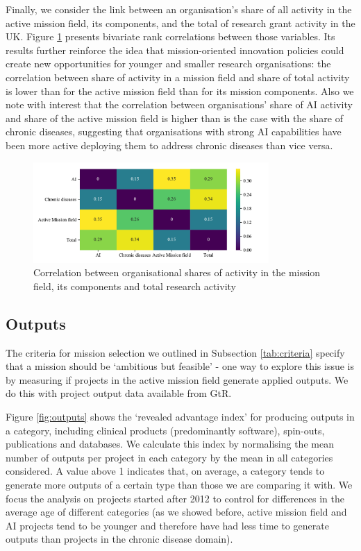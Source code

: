 \documentclass[11pt]{article}
\begin{document}
Finally, we consider the link between an organisation’s share of all activity in the active mission field, its components, and the total of research grant activity in the UK. Figure \ref{fig:share_corr} presents bivariate rank correlations between those variables. Its results further reinforce the idea that mission-oriented innovation policies could create new opportunities for younger and smaller research organisations: the correlation between share of activity in a mission field and share of total activity is lower than for the active mission field than for its mission components. Also we note with interest that the correlation between organisations' share of AI activity and share of the active mission field is higher than is the case with the share of chronic diseases, suggesting that organisations with strong AI capabilities have been more active deploying them to address chronic diseases than vice versa.

\begin{figure}[!ht]
    \centering
    \includegraphics[width=0.8\textwidth]{figures/fig_16_correlation.pdf}
    \caption{Correlation between organisational shares of activity in the mission field, its components and total research activity}
    \label{fig:share_corr}
\end{figure}

\subsection{Outputs}
The criteria for mission selection we outlined in Subsection \ref{tab:criteria} specify that a mission should be `ambitious but feasible’ - one way to explore this issue is by measuring if projects in the active mission field generate applied outputs. We do this with project output data available from GtR.

Figure \ref{fig:outputs} shows the ‘revealed advantage index’ for producing outputs in a category, including clinical products (predominantly software), spin-outs, publications and databases. We calculate this index by normalising the mean number of outputs per project in each category by the mean in all categories considered. A value above 1 indicates that, on average, a category tends to generate more outputs of a certain type than those we are comparing it with. We focus the analysis on projects started after 2012 to control for differences in the average age of different categories (as we showed before, active mission field and AI projects tend to be younger and therefore have had less time to generate outputs than projects in the chronic disease domain).
\end{document}
